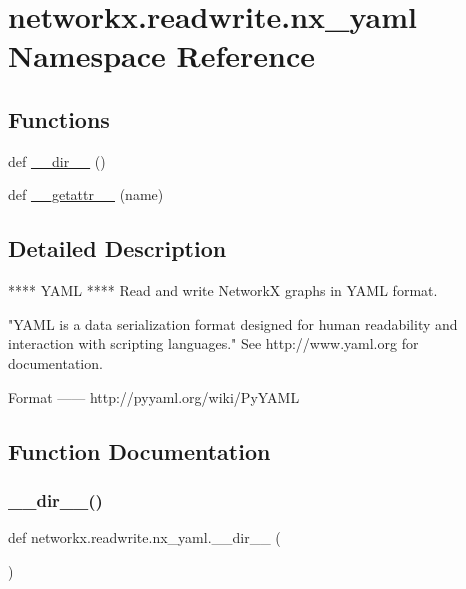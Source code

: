 \hypertarget{namespacenetworkx_1_1readwrite_1_1nx__yaml}{}\section{networkx.\+readwrite.\+nx\+\_\+yaml Namespace Reference}
\label{namespacenetworkx_1_1readwrite_1_1nx__yaml}
\subsection*{Functions}
\begin{DoxyCompactItemize}
\item 
def \hyperlink{namespacenetworkx_1_1readwrite_1_1nx__yaml_a35c1a7a8b8df9e10e76788f5fb6f8350}{\+\_\+\+\_\+dir\+\_\+\+\_\+} ()
\item 
def \hyperlink{namespacenetworkx_1_1readwrite_1_1nx__yaml_a43e1f57269d4f94dd863785c56d5c517}{\+\_\+\+\_\+getattr\+\_\+\+\_\+} (name)
\end{DoxyCompactItemize}


\subsection{Detailed Description}
\begin{DoxyVerb}****
YAML
****
Read and write NetworkX graphs in YAML format.

"YAML is a data serialization format designed for human readability
and interaction with scripting languages."
See http://www.yaml.org for documentation.

Format
------
http://pyyaml.org/wiki/PyYAML\end{DoxyVerb}
 

\subsection{Function Documentation}
\mbox{\label{namespacenetworkx_1_1readwrite_1_1nx__yaml_a35c1a7a8b8df9e10e76788f5fb6f8350}} 
\subsubsection{\texorpdfstring{\+\_\+\+\_\+dir\+\_\+\+\_\+()}{\_\_dir\_\_()}}
{\footnotesize\ttfamily def networkx.\+readwrite.\+nx\+\_\+yaml.\+\_\+\+\_\+dir\+\_\+\+\_\+ (\begin{DoxyParamCaption}{ }\end{DoxyParamCaption})}

